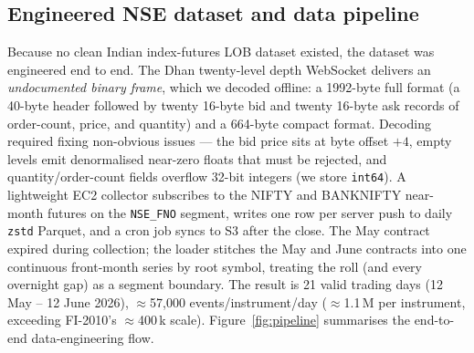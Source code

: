 \documentclass[10pt,twocolumn]{article}
\begin{document}
\subsection{Engineered NSE dataset and data pipeline}
Because no clean Indian index-futures LOB dataset existed, the dataset was engineered end to end. The Dhan
twenty-level depth WebSocket delivers an \emph{undocumented binary frame}, which we decoded offline: a
1992-byte full format (a 40-byte header followed by twenty 16-byte bid and twenty 16-byte ask records of
order-count, price, and quantity) and a 664-byte compact format. Decoding required fixing non-obvious issues
--- the bid price sits at byte offset $+4$, empty levels emit denormalised near-zero floats that must be
rejected, and quantity/order-count fields overflow 32-bit integers (we store \texttt{int64}). A lightweight
EC2 collector subscribes to the NIFTY and BANKNIFTY near-month futures on the \texttt{NSE\_FNO} segment,
writes one row per server push to daily \texttt{zstd} Parquet, and a cron job syncs to S3 after the close. The
May contract expired during collection; the loader stitches the May and June contracts into one continuous
front-month series by root symbol, treating the roll (and every overnight gap) as a segment boundary. The
result is 21 valid trading days (12 May -- 12 June 2026), $\approx$57{,}000 events/instrument/day
($\approx$1.1\,M per instrument, exceeding FI-2010's $\approx$400\,k scale). Figure~\ref{fig:pipeline}
summarises the end-to-end data-engineering flow.
\end{document}
